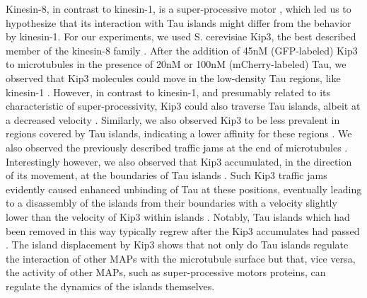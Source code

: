 Kinesin-8, in contrast to kinesin-1, is a super-processive motor , which led us to hypothesize that its interaction with Tau islands might differ from the behavior by kinesin-1. For our experiments, we used S. cerevisiae Kip3, the best described member of the kinesin-8 family . After the addition of 45nM (GFP-labeled) Kip3 to microtubules in the presence of 20nM or 100nM (mCherry-labeled) Tau, we observed that Kip3 molecules could move in the low-density Tau regions, like kinesin-1 . However, in contrast to kinesin-1, and presumably related to its characteristic of super-processivity, Kip3 could also traverse Tau islands, albeit at a decreased velocity . Similarly, we also observed Kip3 to be less prevalent in regions covered by Tau islands, indicating a lower affinity for these regions . We also observed the previously described  traffic jams at the end of microtubules . Interestingly however, we also observed that Kip3 accumulated, in the direction of its movement, at the boundaries of Tau islands . Such Kip3 traffic jams evidently caused enhanced unbinding of Tau at these positions, eventually leading to a disassembly of the islands from their boundaries with a velocity slightly lower than the velocity of Kip3 within islands . Notably, Tau islands which had been removed in this way typically regrew after the Kip3 accumulates had passed . The island displacement by Kip3 shows that not only do Tau islands regulate the interaction of other MAPs with the microtubule surface but that, vice versa, the activity of other MAPs, such as super-processive motors proteins, can regulate the dynamics of the islands themselves.

